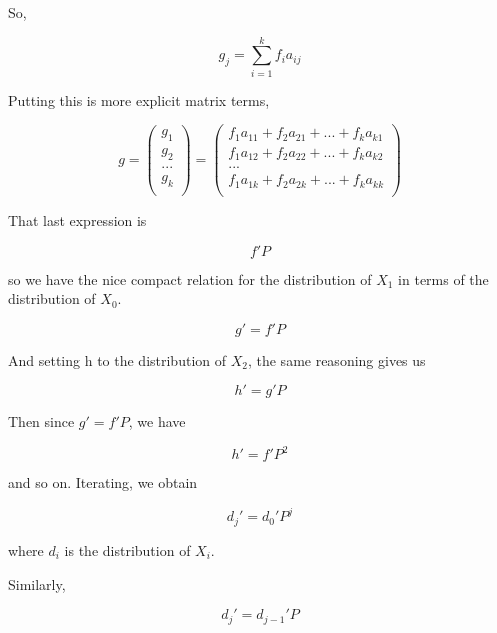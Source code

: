\documentclass[
  letterpaper,
  DIV=11,
  numbers=noendperiod,
  oneside]{scrreprt}
\begin{document}
So,

\[
g_j = \sum_{i=1}^k f_i a_{ij}
\]

Putting this is more explicit matrix terms,

\[
g = \left (
\begin{array}{rrrr}
g_1 \\
g_2 \\
... \\
g_k \\
\end{array}
\right )
=
\left (
\begin{array}{rr}
f_1 a_{11} + f_2 a_{21} + ... + f_k a_{k1} \\
f_1 a_{12} + f_2 a_{22} + ... + f_k a_{k2} \\
... \\
f_1 a_{1k} + f_2 a_{2k} + ... + f_k a_{kk} \\
\end{array}
\right )
\]

That last expression is

\[
f'P
\]

so we have the nice compact relation for the distribution of \(X_1\) in
terms of the distribution of \(X_0\).{}

\[
g' = f'P
\]

And setting h to the distribution of \(X_2\), the same reasoning gives
us

\[
h' = g'P 
\]

Then since \(g' = f'P\), we have {}

\[
h' = f'P^2 
\]

and so on. Iterating, we obtain

\[
d_j' = d_0' P^j 
\]

where \(d_i\) is the distribution of \(X_i\).

Similarly,

\[
d_j' = d_{j-1}' P
\]
\end{document}
